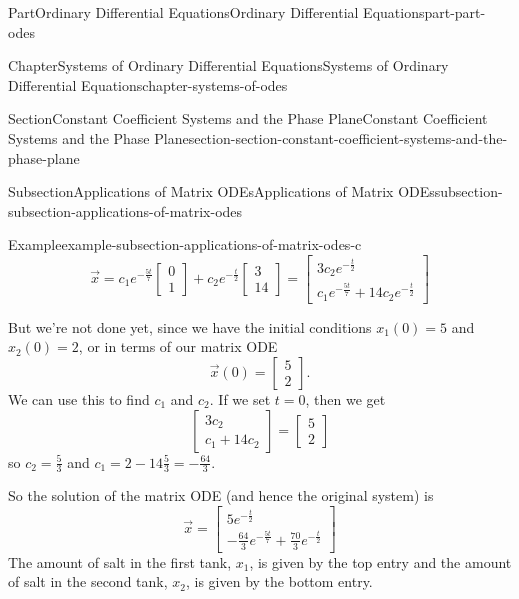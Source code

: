 \documentclass[twoside,10pt,]{book}
\numberwithin{equation}{part}
\begin{document}
\begin{partptx}{Part}{Ordinary Differential Equations}{}{Ordinary Differential Equations}{}{}{part-part-odes}
\begin{chapterptx}{Chapter}{Systems of Ordinary Differential Equations}{}{Systems of Ordinary Differential Equations}{}{}{chapter-systems-of-odes}
\begin{sectionptx}{Section}{Constant Coefficient Systems and the Phase Plane}{}{Constant Coefficient Systems and the Phase Plane}{}{}{section-section-constant-coefficient-systems-and-the-phase-plane}
\begin{subsectionptx}{Subsection}{Applications of Matrix ODEs}{}{Applications of Matrix ODEs}{}{}{subsection-subsection-applications-of-matrix-odes}
\begin{example}{Example}{}{example-subsection-applications-of-matrix-odes-c}
\begin{equation*}
\vec{x} = c_{1}e^{-\frac{5t}{7}}\begin{bmatrix}0\\1\end{bmatrix} + c_{2}e^{-\frac{t}{2}}\begin{bmatrix}3\\14\end{bmatrix} = \begin{bmatrix}3c_{2}e^{-\frac{t}{2}} \\ c_{1}e^{-\frac{5t}{7}}+14c_{2}e^{-\frac{t}{2}}\end{bmatrix}
\end{equation*}
%
\par
But we're not done yet, since we have the initial conditions \(x_{1}(0) = 5\) and \(x_{2}(0) = 2\), or in terms of our matrix ODE%
\begin{equation*}
\vec{x}(0) = \begin{bmatrix}5\\2\end{bmatrix}.
\end{equation*}
We can use this to find \(c_{1}\) and \(c_{2}\). If we set \(t=0\), then we get%
\begin{equation*}
\begin{bmatrix}3c_{2} \\ c_{1} + 14c_{2}\end{bmatrix} = \begin{bmatrix}5\\2\end{bmatrix}
\end{equation*}
so \(c_{2} = \frac{5}{3}\) and \(c_{1} = 2 - 14\frac{5}{3} = -\frac{64}{3}\).%
\par
So the solution of the matrix ODE (and hence the original system) is%
\begin{equation*}
\vec{x} = \begin{bmatrix}5e^{-\frac{t}{2}} \\ -\frac{64}{3}e^{-\frac{5t}{7}}+\frac{70}{3}e^{-\frac{t}{2}}\end{bmatrix}
\end{equation*}
The amount of salt in the first tank, \(x_{1}\), is given by the top entry and the amount of salt in the second tank, \(x_{2}\), is given by the bottom entry.%
\end{example}
\end{subsectionptx}
%
%
\typeout{************************************************}

\end{sectionptx}
\end{chapterptx}
\end{partptx}
\end{document}
